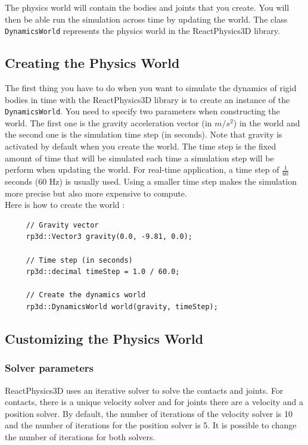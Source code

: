 \documentclass[a4paper,12pt]{article}
\begin{document}
    The physics world will contain the bodies and joints that you create. You will then be able run the simulation across time by updating the world.
    The class \texttt{DynamicsWorld} represents the physics world in the ReactPhysics3D library.

    \subsection{Creating the Physics World}

    The first thing you have to do when you want to simulate the dynamics of rigid bodies in time with the ReactPhysics3D library is to create an instance
    of the \texttt{DynamicsWorld}. You need to specify two parameters when constructing the world. The first one is the gravity acceleration  vector (in $m / s^2$) in the world and
    the second one is the simulation time step (in seconds). Note that gravity is activated by default when you create the world. The time step is the fixed amount of time that will be simulated
    each time a simulation step will be perform when updating the world. For real-time application, a time step of $\frac{1}{60}$ seconds (60 Hz) is usually used. Using a smaller time step
    makes the simulation more precise but also more expensive to compute. \\

    Here is how to create the world : \\

    \begin{lstlisting}
     // Gravity vector
     rp3d::Vector3 gravity(0.0, -9.81, 0.0);

     // Time step (in seconds)
     rp3d::decimal timeStep = 1.0 / 60.0;

     // Create the dynamics world
     rp3d::DynamicsWorld world(gravity, timeStep);
  \end{lstlisting}

    \subsection{Customizing the Physics World}

    \subsubsection{Solver parameters}

    ReactPhysics3D uses an iterative solver to solve the contacts and joints. For contacts, there is a unique velocity solver and for joints there are a velocity and a
    position solver. By default, the number of iterations of the velocity solver is 10 and the number of iterations for the position solver is 5. It is possible to
    change the number of iterations for both solvers. \\
\end{document}
